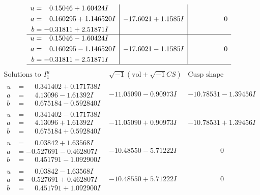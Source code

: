 \documentclass[1p]{elsarticle_modified}
\theoremstyle{definition}
\newcommand{\I}{\sqrt{-1}}
\begin{document}
$$\begin{array}{c|c|c}
\begin{aligned}
u &= \phantom{-}0.15046 + 1.60424 I \\
a &= \phantom{-}0.160295 + 1.146520 I \\
b &= -0.31811 + 2.51871 I\end{aligned}
 & -17.6021 + 1.1585 I & \phantom{-0.000000 } 0 \\ \hline\begin{aligned}
u &= \phantom{-}0.15046 - 1.60424 I \\
a &= \phantom{-}0.160295 - 1.146520 I \\
b &= -0.31811 - 2.51871 I\end{aligned}
 & -17.6021 - 1.1585 I & \phantom{-0.000000 } 0\\
 \hline 
 \end{array}$$\newpage$$\begin{array}{c|c|c}  
\text{Solutions to }I^u_{1}& \I (\text{vol} + \sqrt{-1}CS) & \text{Cusp shape}\\
 \hline 
\begin{aligned}
u &= \phantom{-}0.341402 + 0.171738 I \\
a &= \phantom{-}4.13096 - 1.61392 I \\
b &= \phantom{-}0.675184 - 0.592840 I\end{aligned}
 & -11.05090 - 0.90973 I & -10.78531 - 1.39456 I \\ \hline\begin{aligned}
u &= \phantom{-}0.341402 - 0.171738 I \\
a &= \phantom{-}4.13096 + 1.61392 I \\
b &= \phantom{-}0.675184 + 0.592840 I\end{aligned}
 & -11.05090 + 0.90973 I & -10.78531 + 1.39456 I \\ \hline\begin{aligned}
u &= \phantom{-}0.03842 + 1.63568 I \\
a &= -0.527691 - 0.462807 I \\
b &= \phantom{-}0.451791 - 1.092900 I\end{aligned}
 & -10.48550 - 5.71222 I & \phantom{-0.000000 } 0 \\ \hline\begin{aligned}
u &= \phantom{-}0.03842 - 1.63568 I \\
a &= -0.527691 + 0.462807 I \\
b &= \phantom{-}0.451791 + 1.092900 I\end{aligned}
 & -10.48550 + 5.71222 I & \phantom{-0.000000 } 0 \\ \hline\begin{aligned}

\end{aligned}
\end{array}$$
\end{document}
